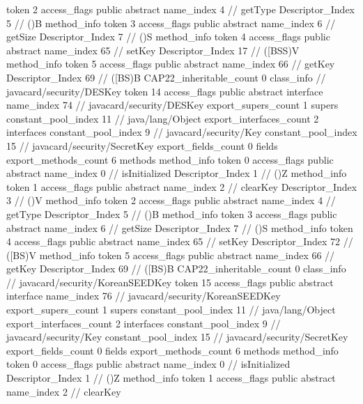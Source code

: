{{{{{					token	2
					access_flags	public abstract
					name_index	4		// getType
					Descriptor_Index	5		// ()B
				}
				method_info {
					token	3
					access_flags	public abstract
					name_index	6		// getSize
					Descriptor_Index	7		// ()S
				}
				method_info {
					token	4
					access_flags	public abstract
					name_index	65		// setKey
					Descriptor_Index	17		// ([BSS)V
				}
				method_info {
					token	5
					access_flags	public abstract
					name_index	66		// getKey
					Descriptor_Index	69		// ([BS)B
				}
			}
			CAP22_inheritable_count	0
		}
		class_info {		// javacard/security/DESKey
			token	14
			access_flags	public abstract interface
			name_index	74		// javacard/security/DESKey
			export_supers_count	1
			supers {
				constant_pool_index	11		// java/lang/Object
			}
			export_interfaces_count	2
			interfaces {
				constant_pool_index	9		// javacard/security/Key
				constant_pool_index	15		// javacard/security/SecretKey
			}
			export_fields_count	0
			fields {
			}
			export_methods_count	6
			methods {
				method_info {
					token	0
					access_flags	public abstract
					name_index	0		// isInitialized
					Descriptor_Index	1		// ()Z
				}
				method_info {
					token	1
					access_flags	public abstract
					name_index	2		// clearKey
					Descriptor_Index	3		// ()V
				}
				method_info {
					token	2
					access_flags	public abstract
					name_index	4		// getType
					Descriptor_Index	5		// ()B
				}
				method_info {
					token	3
					access_flags	public abstract
					name_index	6		// getSize
					Descriptor_Index	7		// ()S
				}
				method_info {
					token	4
					access_flags	public abstract
					name_index	65		// setKey
					Descriptor_Index	72		// ([BS)V
				}
				method_info {
					token	5
					access_flags	public abstract
					name_index	66		// getKey
					Descriptor_Index	69		// ([BS)B
				}
			}
			CAP22_inheritable_count	0
		}
		class_info {		// javacard/security/KoreanSEEDKey
			token	15
			access_flags	public abstract interface
			name_index	76		// javacard/security/KoreanSEEDKey
			export_supers_count	1
			supers {
				constant_pool_index	11		// java/lang/Object
			}
			export_interfaces_count	2
			interfaces {
				constant_pool_index	9		// javacard/security/Key
				constant_pool_index	15		// javacard/security/SecretKey
			}
			export_fields_count	0
			fields {
			}
			export_methods_count	6
			methods {
				method_info {
					token	0
					access_flags	public abstract
					name_index	0		// isInitialized
					Descriptor_Index	1		// ()Z
				}
				method_info {
					token	1
					access_flags	public abstract
					name_index	2		// clearKey
}}}}}
